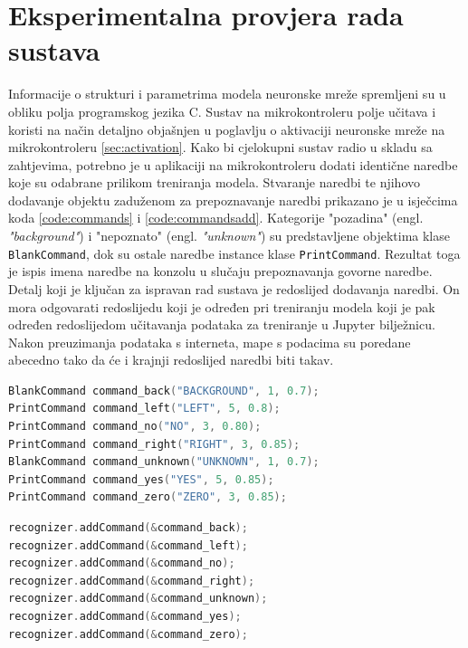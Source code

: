 \chapter{Eksperimentalna provjera rada sustava}
\label{pog:implement}

Informacije o strukturi i parametrima modela neuronske mreže spremljeni su u obliku polja
programskog jezika C. Sustav na mikrokontroleru polje učitava i koristi na način detaljno 
objašnjen 
u poglavlju o aktivaciji neuronske mreže na mikrokontroleru \ref{sec:activation}.
Kako bi cjelokupni sustav radio u skladu sa zahtjevima, potrebno je u aplikaciji
na mikrokontroleru dodati identične naredbe koje su odabrane prilikom treniranja
modela. Stvaranje naredbi te njihovo dodavanje objektu zaduženom za prepoznavanje
naredbi prikazano je u isječcima koda \ref{code:commands} i \ref{code:commandsadd}.
Kategorije "pozadina" (engl. \textit{"background"}) i
"nepoznato" (engl. \textit{"unknown"}) su predstavljene objektima klase \texttt{BlankCommand}, 
dok su ostale naredbe 
instance klase \texttt{PrintCommand}. Rezultat toga je ispis imena naredbe na konzolu u slučaju
prepoznavanja govorne naredbe. Detalj koji je ključan za ispravan rad sustava je redoslijed
dodavanja naredbi. On mora odgovarati redoslijedu koji je određen pri treniranju modela koji
je pak određen redoslijedom učitavanja podataka za treniranje u Jupyter bilježnicu. Nakon
preuzimanja podataka s interneta, mape s podacima su poredane abecedno tako da 
će i krajnji redoslijed naredbi biti takav.

\begin{lstlisting}[language=C++, caption=Stvaranje naredbi, label=code:commands]
BlankCommand command_back("BACKGROUND", 1, 0.7);
PrintCommand command_left("LEFT", 5, 0.8);
PrintCommand command_no("NO", 3, 0.80);
PrintCommand command_right("RIGHT", 3, 0.85);
BlankCommand command_unknown("UNKNOWN", 1, 0.7);
PrintCommand command_yes("YES", 5, 0.85);
PrintCommand command_zero("ZERO", 3, 0.85);
\end{lstlisting}

\newpage
\begin{lstlisting}[language=C++, caption=Dodavanje naredbi, label=code:commandsadd]
recognizer.addCommand(&command_back);
recognizer.addCommand(&command_left);
recognizer.addCommand(&command_no);
recognizer.addCommand(&command_right);
recognizer.addCommand(&command_unknown);
recognizer.addCommand(&command_yes);
recognizer.addCommand(&command_zero);
\end{lstlisting}

